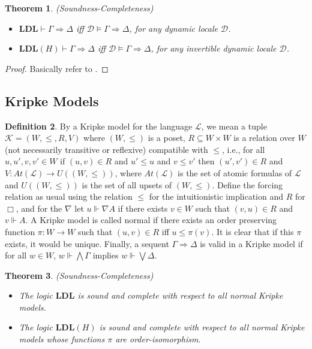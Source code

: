 \documentclass[12pt,a4paper]{article}
\theoremstyle{plain}
\newtheorem{thm}{Theorem}[section]
\theoremstyle{definition}
\newtheorem{dfn}[thm]{Definition}
\begin{document}
\begin{thm}\label{t4-2}(Soundness-Completeness) 
\begin{itemize}
\item[$(i)$]
$ \mathbf{LDL} \vdash \Gamma \Rightarrow \Delta$ iff $\mathcal{D} \vDash \Gamma \Rightarrow \Delta$, for any dynamic locale $\mathcal{D}$.
\item[$(ii)$]
$ \mathbf{LDL}(H) \vdash \Gamma \Rightarrow \Delta$ iff $\mathcal{D} \vDash \Gamma \Rightarrow \Delta$,  for any invertible dynamic locale $\mathcal{D}$.
\end{itemize}

\end{thm}
\begin{proof}
Basically refer to \cite{Amir}.
\end{proof}

\subsection{Kripke Models} \label{KripkeModels}

\begin{dfn}
By a Kripke model for the language $\mathcal{L}$, we mean a tuple $\mathcal{K}=(W, \leq, R, V)$ where $(W, \leq)$ is a poset, $R \subseteq W \times W$ is a relation over $W$ (not necessarily transitive or reflexive) compatible with $\leq$, i.e., for all $u, u', v, v' \in W$ if $(u, v) \in R$ and $u' \leq u$ and $v \leq v'$ then $(u', v') \in R$ and $V: At(\mathcal{L}) \to U((W, \leq))$, where $At(\mathcal{L})$ is the set of atomic formulas of $\mathcal{L}$ and $U((W, \leq))$ is the set of all upsets of $(W, \leq)$. Define the forcing relation as usual using the relation $\leq$ for the intuitionistic implication and $R$ for $\Box$, and for the $\nabla$ let $u \Vdash \nabla A$ if there exists $v \in W$ such that $(v, u) \in R$ and $v \Vdash A$. A Kripke model is called normal if there exists an order preserving function $\pi : W \to W$ such that $(u, v) \in R$ iff $u \leq \pi(v)$. It is clear that if this $\pi$ exists, it would be unique. Finally, a sequent $\Gamma \Rightarrow \Delta$ is valid in a Kripke model if for all $w \in W$, $w \Vdash \bigwedge \Gamma$ implies $w \Vdash \bigvee \Delta$.
\end{dfn}

\begin{thm}(Soundness-Completeness)
\begin{itemize}
\item[$(i)$]
The logic $\mathbf{LDL}$ is sound and complete with respect to all normal Kripke models. 
\item[$(ii)$]
The logic $\mathbf{LDL}(H)$ is sound and complete with respect to all normal Kripke models whose functions $\pi$ are order-isomorphism. 
\end{itemize}
\end{thm}
\end{document}
